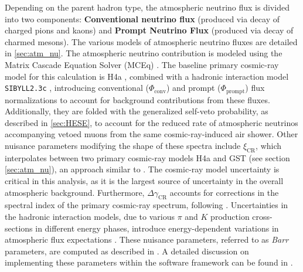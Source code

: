 Depending on the parent hadron type, the atmospheric neutrino flux is divided into two components: \textbf{Conventional neutrino flux} (produced via decay of charged pions and kaons) and \textbf{Prompt Neutrino Flux} (produced via decay of charmed mesons). The various models of atmospheric neutrino fluxes are detailed in \ref{sec:atm_nu}. The atmospheric neutrino contribution is modeled using the Matrix Cascade Equation Solver (MCEq) . The baseline primary cosmic-ray model for this calculation is H4a , combined with a hadronic interaction model \texttt{SIBYLL2.3c} , introducing conventional ($\Phi_{\mathrm{conv}}$) and prompt ($\Phi_{\mathrm{prompt}}$) flux normalizations to account for background contributions from these fluxes. Additionally, they are folded with the generalized self-veto probability, as described in \ref{sec:HESE}, to account for the reduced rate of atmospheric neutrinos accompanying vetoed muons from the same cosmic-ray-induced air shower. Other nuisance parameters modifying the shape of these spectra include $\xi_{\mathrm{CR}}$, which interpolates between two primary cosmic-ray models H4a and GST (see section \ref{sec:atm_nu}), an approach similar to . The cosmic-ray model uncertainty is critical in this analysis, as it is the largest source of uncertainty in the overall atmospheric background. Furthermore, $\Delta\gamma_{\mathrm{CR}}$ accounts for corrections in the spectral index of the primary cosmic-ray spectrum, following . Uncertainties in the hadronic interaction models, due to various $\pi$ and $K$ production cross-sections in different energy phases, introduce energy-dependent variations in atmospheric flux expectations . These nuisance parameters, referred to as \emph{Barr} parameters, are computed as described in . A detailed discussion on implementing these parameters within the software framework can be found in .

